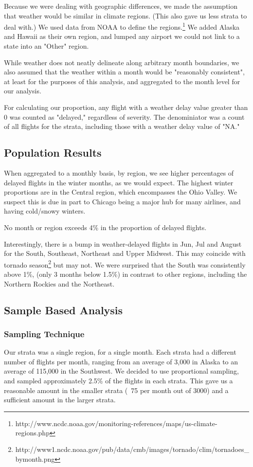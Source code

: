 \documentclass{article}
\begin{document}
Because we were dealing with geographic differences, we made the assumption that weather would be similar in climate regions. (This also gave us less strata to deal with.) We used data from NOAA to define the regions.\footnote{http://www.ncdc.noaa.gov/monitoring-references/maps/us-climate-regions.php} We added Alaska and Hawaii as their own region, and lumped any airport we could not link to a state into an "Other" region.

While weather does not neatly delineate along arbitrary month boundaries, we also assumed that the weather within a month would be "reasonably consistent", at least for the purposes of this analysis, and aggregated to the month level for our analysis.

For calculating our proportion, any flight with a weather delay value greater than 0 was counted as "delayed," regardless of severity. The denominiator was a count of all flights for the strata, including those with a weather delay value of "NA." 

\subsection{Population Results}
When aggregated to a monthly basis, by region, we see higher percentages of delayed flights in the winter months, as we would expect. The highest winter proportions are in the Central region, which encompasses the Ohio Valley. We suspect this is due in part to Chicago being a major hub for many airlines, and having cold/snowy winters.

No month or region exceeds 4\% in the proportion of delayed flights.

Interestingly, there is a bump in weather-delayed flights in Jun, Jul and August for the South, Southeast, Northeast and Upper Midwest. This may coincide with tornado season\footnote{http://www1.ncdc.noaa.gov/pub/data/cmb/images/tornado/clim/tornadoes_bymonth.png} but may not. We were surprised that the South was consistently above 1\%, (only 3 months below 1.5\%) in contrast to other regions, including the Northern Rockies and the Northeast.


\subsection{Sample Based Analysis}
\subsubsection{Sampling Technique}
Our strata was a single region, for a single month. Each strata had a different number of flights per month, ranging from an average of 3,000 in Alaska to an average of 115,000 in the Southwest. We decided to use proportional sampling, and sampled approximately 2.5\% of the flights in each strata. This gave us a reasonable amount in the smaller strata (~75 per month out of 3000) and a sufficient amount in the larger strata. 
\end{document}
